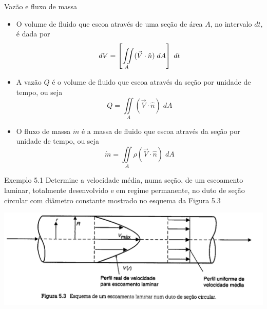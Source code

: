 \documentclass[t,%
brazilian,%
11pt,%
aspectratio=169,%
table%
]{beamer}
\begin{document}
\newcommand{\volume}{{\ooalign{\hfil$V$\hfil\cr\kern0.08em--\hfil\cr}}}
\begin{frame}{Vazão e fluxo de massa}
    \begin{itemize}
        \item O volume de fluido que escoa através de uma seção de área \(A\),
            no intervalo \(dt\), é dada por
            \[
                d\volume = \left[\iint\limits_A(\vec{V}\cdot\hat{n})\;dA\right]\;dt
            \]
        \item A vazão \(Q\) é o volume de fluido que escoa através da seção por unidade de tempo, ou seja
            \[
                Q=\iint\limits_A(\vec{V}\cdot\hat{n})\;dA
            \]
        \item O fluxo de massa \(\dot{m}\) é a massa de fluido que escoa
            através da seção por unidade de tempo, ou seja
            \[
                \dot{m}=\iint\limits_A\rho(\vec{V}\cdot\hat{n})\;dA
            \]
    \end{itemize}
\end{frame}

\begin{frame}{Exemplo 5.1}
    Determine a velocidade média, numa seção, de um escoamento laminar, totalmente
    desenvolvido e em regime permanente, no duto de seção circular com diâmetro
    constante mostrado no esquema da Figura 5.3

    \centering
    \includegraphics[width=\textwidth]{images/Captura de tela de 2025-04-23 17-09-17.png}
\end{frame}
\end{document}
